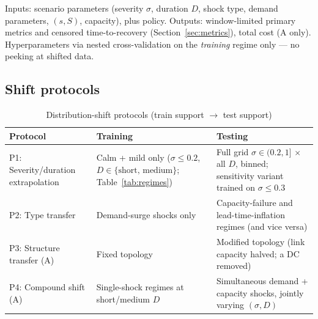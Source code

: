 \documentclass[12pt,a4paper]{article}
\begin{document}
Inputs: scenario parameters (severity $\sigma$, duration $D$, shock type, demand parameters, $(s,S)$, capacity), plus policy. Outputs: window-limited primary metrics and censored time-to-recovery (Section~\ref{sec:metrics}), total cost (A only). Hyperparameters via nested cross-validation on the \emph{training} regime only --- no peeking at shifted data.

\subsection{Shift protocols}\label{sec:shift}

\begin{table}[H]
\centering
\caption{Distribution-shift protocols (train support $\rightarrow$ test support)}
\label{tab:shift}
\footnotesize
\begin{tabular}{p{3.0cm}p{5.4cm}p{5.8cm}}
\toprule
\textbf{Protocol} & \textbf{Training} & \textbf{Testing} \\
\midrule
P1: Severity/duration extrapolation & Calm + mild only ($\sigma \leq 0.2$, $D \in \{\text{short, medium}\}$; Table~\ref{tab:regimes}) & Full grid $\sigma \in (0.2, 1]$ $\times$ all $D$, binned; sensitivity variant trained on $\sigma \leq 0.3$ \\
P2: Type transfer & Demand-surge shocks only & Capacity-failure and lead-time-inflation regimes (and vice versa) \\
P3: Structure transfer (A) & Fixed topology & Modified topology (link capacity halved; a DC removed) \\
P4: Compound shift (A) & Single-shock regimes at short/medium $D$ & Simultaneous demand + capacity shocks, jointly varying $(\sigma, D)$ \\
\bottomrule
\end{tabular}
\end{table}
\end{document}
